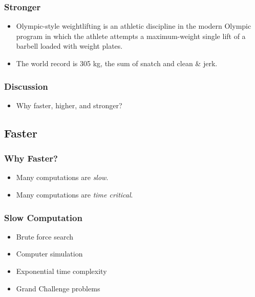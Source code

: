 \documentclass{beamer}
\begin{document}
\begin{CJK}{UTF8}{bsmi}
  \begin{frame}
    \frametitle{Stronger}
    \begin{itemize}
    \item Olympic-style weightlifting is an athletic discipline in the modern Olympic program in which the athlete attempts a maximum-weight single lift of a barbell loaded with weight plates.
    \item The world record is 305 kg, the sum of snatch and clean \& jerk. 
    \end{itemize}
  \end{frame}

  \begin{frame}
    \frametitle{Discussion}
    \Large 
    \begin{itemize}
    \item Why faster, higher, and stronger?
    \end{itemize}
  \end{frame}


  \subsection{Faster}

  \begin{frame}
    \frametitle{Why Faster?}
    \begin{itemize}
    \item Many computations are {\em slow}.
    \item Many computations are {\em time critical}.
    \end{itemize}
  \end{frame}

  \begin{frame}
    \frametitle{Slow Computation}
    \begin{itemize}
    \item Brute force search
    \item Computer simulation
    \item Exponential time complexity
    \item Grand Challenge problems
    \end{itemize}
  \end{frame}


\end{CJK}
\end{document}
